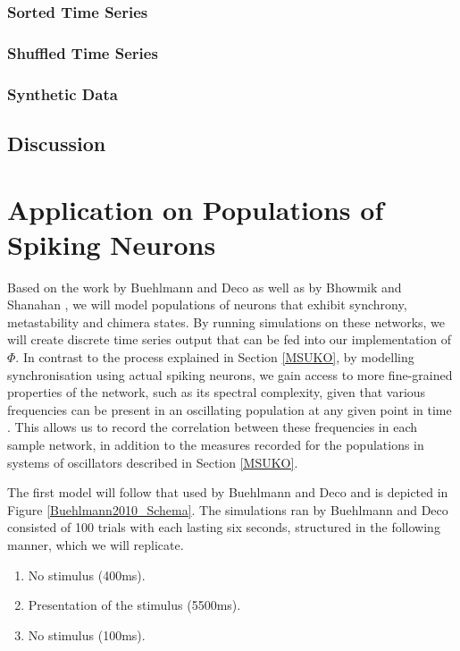 \documentclass[a4paper,11pt]{article}
\begin{document}
\subsubsection{Sorted Time Series}

\subsubsection{Shuffled Time Series}

\subsubsection{Synthetic Data}

\subsection{Discussion}


\clearpage
\section{Application on Populations of Spiking Neurons}
\label{MSUSNN}

Based on the work by Buehlmann and Deco \cite{Buehlmann2010} as well as by Bhowmik and Shanahan \cite{Bhowmik2013}, we will model populations of neurons that exhibit synchrony, metastability and chimera states. By running simulations on these networks, we will create discrete time series output that can be fed into our implementation of $\Phi$. In contrast to the process explained in Section \ref{MSUKO}, by modelling synchronisation using actual spiking neurons, we gain access to more fine-grained properties of the network, such as its spectral complexity, given that various frequencies can be present in an oscillating population at any given point in time \cite{Bhowmik2013}. This allows us to record the correlation between these frequencies in each sample network, in addition to the measures recorded for the populations in systems of oscillators described in Section \ref{MSUKO}.

The first model will follow that used by Buehlmann and Deco and is depicted in Figure \ref{Buehlmann2010_Schema}. The simulations ran by Buehlmann and Deco consisted of 100 trials with each lasting six seconds, structured in the following manner, which we will replicate.
\begin{enumerate}
\item{No stimulus (400ms).}
\item{Presentation of the stimulus (5500ms).}
\item{No stimulus (100ms)}.
\end{enumerate}
\end{document}
